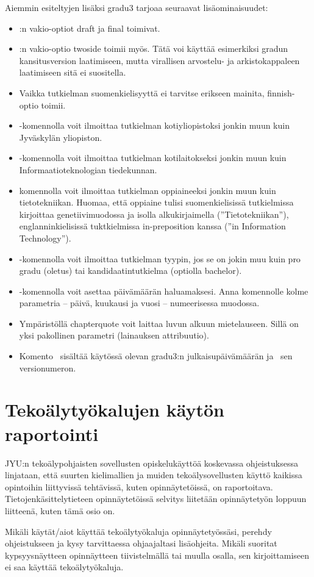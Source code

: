 \documentclass[utf8]{gradu3}
\begin{document}
Aiemmin esiteltyjen lisäksi gradu3 tarjoaa seuraavat lisäominaisuudet:
\begin{itemize}
\item \LaTeXe:n vakio-optiot draft ja final toimivat.
\item \LaTeXe:n vakio-optio twoside toimii myös.  Tätä voi käyttää
  esimerkiksi gradun kansitusversion laatimiseen, mutta virallisen
  arvostelu- ja arkistokappaleen laatimiseen sitä ei suositella.
\item Vaikka tutkielman suomenkielisyyttä ei tarvitse erikseen
  mainita, finnish-optio toimii.
\item \string\university-komennolla voit ilmoittaa tutkielman
  kotiyliopistoksi jonkin muun kuin Jyväskylän yliopiston.
\item  \string\department-komennolla voit ilmoittaa tutkielman
  kotilaitokseksi jonkin muun kuin Informaatioteknologian tiedekunnan.
\item \string\subject-komennolla voit ilmoittaa tutkielman
  oppiaineeksi jonkin muun kuin tietotekniikan.  Huomaa, että oppiaine
  tulisi suomenkielisissä tutkielmissa kirjoittaa genetiivimuodossa ja
  isolla alkukirjaimella (''Tietotekniikan''), englanninkielisissä
  tuktkielmissa in-preposition kanssa (''in Information Technology'').
\item \string\type-komennolla voit ilmoittaa tutkielman tyypin, jos se
  on jokin muu kuin pro gradu (oletus) tai kandidaatintutkielma
  (optiolla bachelor).
\item \string\setdate-komennolla voit asettaa päivämäärän
  haluamaksesi.  Anna komennolle kolme parametria -- päivä,
  kuukausi ja vuosi -- numeerisessa muodossa.
\item Ympäristöllä chapterquote voit laittaa luvun alkuun
  mietelauseen.  Sillä on yksi pakollinen parametri (lainauksen
  attribuutio).
\item Komento \string\graduclsdate\ sisältää käytössä olevan gradu3:n
  julkaisupäivämäärän ja \string\graduclsversion\ sen versionumeron.
\end{itemize}

\section{Tekoälytyökalujen käytön raportointi}
JYU:n tekoälypohjaisten sovellusten opiskelukäyttöä koskevassa
ohjeistuksessa~\cite{jyu-tekoaly} linjataan, että suurten kielimallien
ja muiden tekoälysovellusten käyttö kaikissa opintoihin liittyvissä
tehtävissä, kuten opinnäytetöissä, on raportoitava.
Tietojenkäsittelytieteen opinnäytetöissä selvitys liitetään
opinnäytetyön loppuun liitteenä, kuten tämä osio on.

Mikäli käytät/aiot käyttää tekoälytyökaluja opinnäytetyössäsi, perehdy
ohjeistukseen ja kysy tarvittaessa ohjaajaltasi lisäohjeita. Mikäli
suoritat kypsyysnäytteen opinnäytteen tiivistelmällä tai muulla
osalla, sen kirjoittamiseen ei saa käyttää tekoälytyökaluja.
\end{document}

